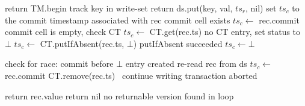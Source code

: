 \begin{algorithm}[t]
  \begin{algorithmic}
       \State  return TM.begin
\EndProcedure
\Statex
       \State  track key in write-set 
       \State  return ds.put(key, val, $ts_r$, nil)
\EndProcedure
%     
\Statex
{} 
			\State \Comment  set $ts_c$ to the commit timestamp associated with rec
			  \Comment commit cell exists
     				\State $ts_c \leftarrow$  rec.commit 
			\Else \Comment commit cell is empty, check CT
      				\State $ts_c  \leftarrow$ CT.get(rec.ts)  
      				  \Comment no CT entry, set status to  $\bot$
      					\State $ts_c \leftarrow$ CT.putIfAbsent(rec.ts, $\bot$)  %
      					 \Comment putIfAbsent succeeded 
      						\State $ts_c  \leftarrow \bot$ 
      					\EndIf
				\EndIf
      				
 				 	\State \Comment check for race: commit before $\bot$ entry  created 
 				 	\State re-read rec from ds
 				 		 \State $ts_c \leftarrow$  rec.commit 
 				 		 \State CT.remove(rec.ts)
 				 	\Else\  
 				 		 continue	\Comment writing transaction aborted	
 				 	\EndIf
				\EndIf
			\EndIf

 			 	\State return  rec.value 
			\EndIf
      \EndFor
      \State  return nil \Comment no returnable version found in loop
      \EndProcedure

\Statex

{}
\end{algorithmic}
\end{algorithm}
